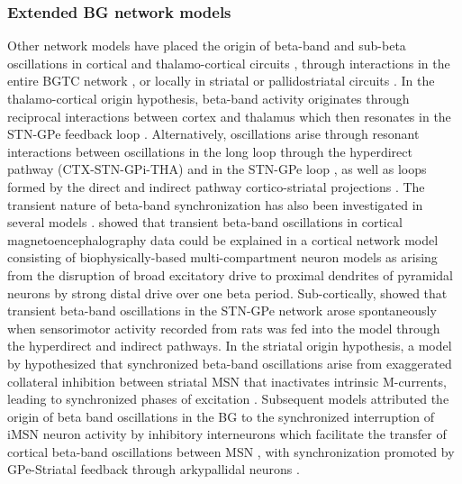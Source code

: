 %
%
%
%
%
%

%
\subsubsection{Extended BG network models}

%
%
%
%

Other network models have placed the origin of beta-band and sub-beta oscillations
in cortical and thalamo-cortical circuits \cite{sherman_neural_2016,pavlides_computational_2015,reis_thalamocortical_2019,liu_neural_2017},
through interactions in the entire BGTC network \cite{pavlides_computational_2015,kumaravelu_biophysical_2016,leblois_competition_2006,kang_interaction_2013,van_albada_mean-field_2009},
or locally in striatal or pallidostriatal circuits \cite{mccarthy_striatal_2011,corbit_pallidostriatal_2016,damodaran_desynchronization_2015}.
%
%
In the thalamo-cortical origin hypothesis, beta-band activity originates through reciprocal
interactions between cortex and thalamus \cite{sherman_neural_2016,reis_thalamocortical_2019}
which then resonates in the STN-GPe feedback loop \cite{pavlides_computational_2015}.
Alternatively, oscillations arise through resonant interactions between oscillations
in the long loop through the hyperdirect pathway (CTX-STN-GPi-THA) and in the STN-GPe
loop \cite{kang_interaction_2013,pavlides_computational_2015},
as well as loops formed by the direct and indirect pathway cortico-striatal projections \cite{van_albada_mean-field_2009}.
%
The transient nature of beta-band synchronization has also been investigated in several models \cite{park_fine_2010,park_neural_2011,sherman_neural_2016,mirzaei_sensorimotor_2017}.
\cite{sherman_neural_2016} showed that transient beta-band oscillations in cortical magnetoencephalography data could be explained in a cortical network model consisting
of biophysically-based multi-compartment neuron models as arising from the disruption
of broad excitatory drive to proximal dendrites of pyramidal neurons by strong distal drive over one beta period. Sub-cortically, \cite{mirzaei_sensorimotor_2017} showed that transient beta-band oscillations in the STN-GPe network arose spontaneously when sensorimotor activity recorded from rats was fed into the model through the hyperdirect and indirect pathways.
%
In the striatal origin hypothesis, a model by \cite{mccarthy_striatal_2011} hypothesized
that synchronized beta-band oscillations arise from exaggerated collateral inhibition
between striatal MSN that inactivates intrinsic M-currents, leading to synchronized phases
of excitation \cite{mccarthy_striatal_2011}. Subsequent models attributed the origin of beta
band oscillations in the BG to the synchronized interruption of iMSN neuron activity
by inhibitory interneurons \cite{damodaran_desynchronization_2015,corbit_pallidostriatal_2016}
which facilitate the transfer of cortical beta-band oscillations between MSN \cite{belic_interplay_2017},
with synchronization promoted by GPe-Striatal feedback through arkypallidal neurons
\cite{corbit_pallidostriatal_2016}.

